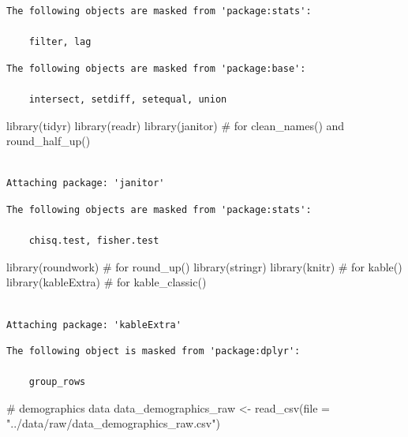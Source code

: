 \documentclass[
  letterpaper,
  DIV=11,
  numbers=noendperiod]{scrreprt}
\newenvironment{Shaded}{\begin{snugshade}}{\end{snugshade}}
\newcommand{\AttributeTok}[1]{\textcolor[rgb]{0.40,0.45,0.13}{#1}}
\newcommand{\CommentTok}[1]{\textcolor[rgb]{0.37,0.37,0.37}{#1}}
\newcommand{\FunctionTok}[1]{\textcolor[rgb]{0.28,0.35,0.67}{#1}}
\newcommand{\NormalTok}[1]{\textcolor[rgb]{0.00,0.23,0.31}{#1}}
\newcommand{\OtherTok}[1]{\textcolor[rgb]{0.00,0.23,0.31}{#1}}
\newcommand{\StringTok}[1]{\textcolor[rgb]{0.13,0.47,0.30}{#1}}
\begin{document}
\begin{verbatim}
The following objects are masked from 'package:stats':

    filter, lag
\end{verbatim}

\begin{verbatim}
The following objects are masked from 'package:base':

    intersect, setdiff, setequal, union
\end{verbatim}

\begin{Shaded}
\begin{Highlighting}[]
\FunctionTok{library}\NormalTok{(tidyr)}
\FunctionTok{library}\NormalTok{(readr)}
\FunctionTok{library}\NormalTok{(janitor) }\CommentTok{\# for clean\_names() and round\_half\_up()}
\end{Highlighting}
\end{Shaded}

\begin{verbatim}

Attaching package: 'janitor'
\end{verbatim}

\begin{verbatim}
The following objects are masked from 'package:stats':

    chisq.test, fisher.test
\end{verbatim}

\begin{Shaded}
\begin{Highlighting}[]
\FunctionTok{library}\NormalTok{(roundwork) }\CommentTok{\# for round\_up()}
\FunctionTok{library}\NormalTok{(stringr)}
\FunctionTok{library}\NormalTok{(knitr) }\CommentTok{\# for kable()}
\FunctionTok{library}\NormalTok{(kableExtra) }\CommentTok{\# for kable\_classic()}
\end{Highlighting}
\end{Shaded}

\begin{verbatim}

Attaching package: 'kableExtra'
\end{verbatim}

\begin{verbatim}
The following object is masked from 'package:dplyr':

    group_rows
\end{verbatim}

\begin{Shaded}
\begin{Highlighting}[]
\CommentTok{\# demographics data}
\NormalTok{data\_demographics\_raw }\OtherTok{\textless{}{-}} \FunctionTok{read\_csv}\NormalTok{(}\AttributeTok{file =} \StringTok{"../data/raw/data\_demographics\_raw.csv"}\NormalTok{) }
\end{Highlighting}
\end{Shaded}
\end{document}
